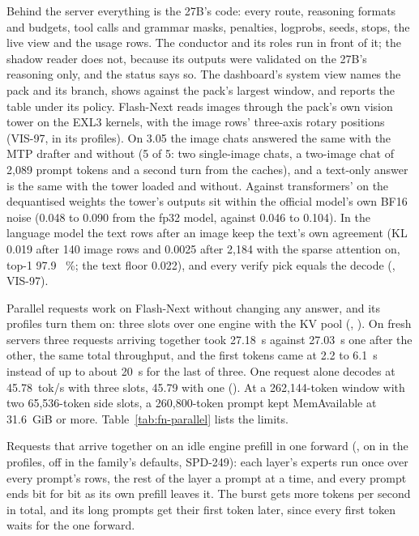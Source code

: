 Behind the server everything is the 27B's code: every route, reasoning formats and budgets, tool calls and grammar masks, penalties, logprobs, seeds, stops, the live view and the usage rows. The conductor and its roles run in front of it; the shadow reader does not, because its outputs were validated on the 27B's reasoning only, and the status says so. The dashboard's system view names the pack and its branch, shows  against the pack's largest window, and reports the table under its policy. Flash-Next reads images through the pack's own vision tower on the EXL3 kernels, with the image rows' three-axis rotary positions (VIS-97,  in its profiles). On 3.05 the image chats answered the same with the MTP drafter and without (5 of 5: two single-image chats, a two-image chat of 2,089 prompt tokens and a second turn from the caches), and a text-only answer is the same with the tower loaded and without. Against transformers'  on the dequantised weights the tower's outputs sit within the official model's own BF16 noise (0.048 to 0.090 from the fp32 model, against 0.046 to 0.104). In the language model the text rows after an image keep the text's own agreement (KL 0.019 after 140 image rows and 0.0025 after 2,184 with the sparse attention on, top-1 97.9 ~\%; the text floor 0.022), and every verify pick equals the decode (, VIS-97).

Parallel requests work on Flash-Next without changing any answer, and its profiles turn them on: three slots over one engine with the KV pool (, ). On fresh servers three requests arriving together took 27.18~s against 27.03~s one after the other, the same total throughput, and the first tokens came at 2.2 to 6.1~s instead of up to about 20~s for the last of three. One request alone decodes at 45.78~tok/s with three slots, 45.79 with one (\measured). At a 262,144-token window with two 65,536-token side slots, a 260,800-token prompt kept MemAvailable at 31.6~GiB or more. Table~\ref{tab:fn-parallel} lists the limits.

Requests that arrive together on an idle engine prefill in one forward (, on in the profiles, off in the family's defaults, SPD-249): each layer's experts run once over every prompt's rows, the rest of the layer a prompt at a time, and every prompt ends bit for bit as its own prefill leaves it. The burst gets more tokens per second in total, and its long prompts get their first token later, since every first token waits for the one forward.

